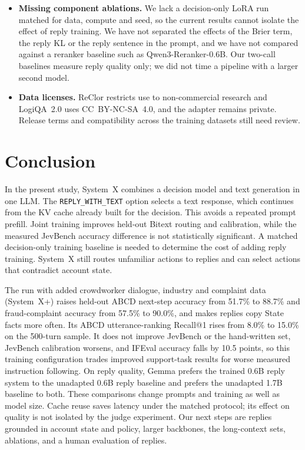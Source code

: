 \documentclass[11pt]{article}
\newcommand{\reply}{\texttt{REPLY\_WITH\_TEXT}}
\newcommand{\sysplus}{System~X+}
\begin{document}
\begin{itemize}
\item \textbf{Missing component ablations.} We lack a decision-only LoRA run matched for data, compute and seed, so the current results cannot isolate the effect of reply training. We have not separated the effects of the Brier term, the reply KL or the reply sentence in the prompt, and we have not compared against a reranker baseline such as Qwen3-Reranker-0.6B. Our two-call baselines measure reply quality only; we did not time a pipeline with a larger second model.
\item \textbf{Data licenses.} ReClor restricts use to non-commercial research and LogiQA~2.0 uses CC~BY-NC-SA~4.0, and the adapter remains private. Release terms and compatibility across the training datasets still need review.
\end{itemize}

\section{Conclusion}
In the present study, System~X combines a decision model and text generation in one LLM. The \reply{} option selects a text response, which continues from the KV cache already built for the decision. This avoids a repeated prompt prefill. Joint training improves held-out Bitext routing and calibration, while the measured JevBench accuracy difference is not statistically significant. A matched decision-only training baseline is needed to determine the cost of adding reply training. System~X still routes unfamiliar actions to replies and can select actions that contradict account state.

The run with added crowdworker dialogue, industry and complaint data (\sysplus{}) raises held-out ABCD next-step accuracy from 51.7\% to 88.7\% and fraud-complaint accuracy from 57.5\% to 90.0\%, and makes replies copy State facts more often. Its ABCD utterance-ranking Recall@1 rises from 8.0\% to 15.0\% on the 500-turn sample. It does not improve JevBench or the hand-written set, JevBench calibration worsens, and IFEval accuracy falls by 10.5 points, so this training configuration trades improved support-task results for worse measured instruction following. On reply quality, Gemma prefers the trained 0.6B reply system to the unadapted 0.6B reply baseline and prefers the unadapted 1.7B baseline to both. These comparisons change prompts and training as well as model size. Cache reuse saves latency under the matched protocol; its effect on quality is not isolated by the judge experiment. Our next steps are replies grounded in account state and policy, larger backbones, the long-context sets, ablations, and a human evaluation of replies.
\end{document}
